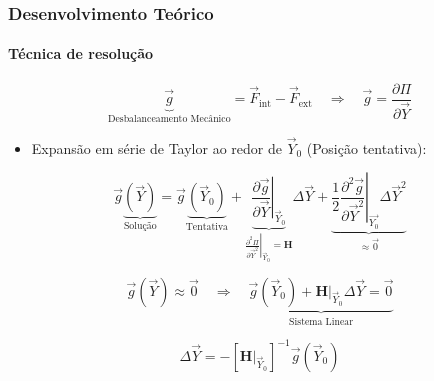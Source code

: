 \documentclass{beamer}
\begin{document}
\begin{frame}
    \frametitle{Desenvolvimento Teórico}
    \framesubtitle{Técnica de resolução}

    \begin{equation}
        \underbrace{\vec{g}}_{\text{Desbalanceamento Mecânico}} = \vec{F}_{\text{int}} - \vec{F}_{\text{ext}} 
        \quad \Rightarrow \quad
        \vec{g} = \dfrac{\partial \varPi}{\partial \vec{Y}}
    \end{equation}

    \begin{itemize}
        \item Expansão em série de Taylor ao redor de \(\vec{Y}_0\) (Posição tentativa):
    \end{itemize}

    \begin{equation}
        \vec{g}\underbrace{\left(\vec{Y}\right)}_{\text{Solução}} = \vec{g}\underbrace{\left(\vec{Y}_0\right)}_{\text{Tentativa}} + \underbrace{\left.\dfrac{\partial \vec{g}}{\partial \vec{Y}}\right|_{\vec{Y}_0}}_{\left.\frac{\partial^2\varPi }{\partial \vec{Y}^2}\right|_{\vec{Y}_0} = \mathbf{H}} \Delta \vec{Y} + \underbrace{\left.\dfrac{1}{2}\dfrac{\partial^2 \vec{g}}{\partial \vec{Y}^2}\right|_{\vec{Y_0}}\Delta \vec{Y}^2}_{\approx \vec{0}}
    \end{equation}

    \begin{equation}
        \vec{g}\left(\vec{Y}\right)\approx \vec{0} 
        \quad \Rightarrow \quad
        \underbrace{\vec{g}\left(\vec{Y}_0\right) + \left.\mathbf{H}\right|_{\vec{Y}_0}\Delta \vec{Y} = \vec{0}}_{\text{Sistema Linear}}
    \end{equation}

    \begin{equation}
        \Delta \vec{Y} = -\left[\left.\mathbf{H}\right|_{\vec{Y}_0}\right]^{-1}\vec{g}\left(\vec{Y}_0\right)  
    \end{equation}




\end{frame}
\end{document}
